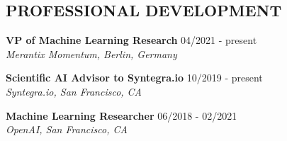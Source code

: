 \documentclass[10pt,centered]{./res} %
\begin{document}
\vspace*{-1.5cm}
\begin{resume}
\vspace{0.4cm}


\section{\color{ResumeBlue}PROFESSIONAL DEVELOPMENT}
{\bf VP of Machine Learning Research} \hfill04/2021 - present \\
{\it Merantix Momentum, Berlin, Germany}

{\bf Scientific AI Advisor to Syntegra.io } \hfill10/2019 - present \\
{\it Syntegra.io, San Francisco, CA}

{\bf Machine Learning Researcher} \hfill06/2018 - 02/2021 \\
{\it OpenAI, San Francisco, CA}


\end{resume}
\end{document}
